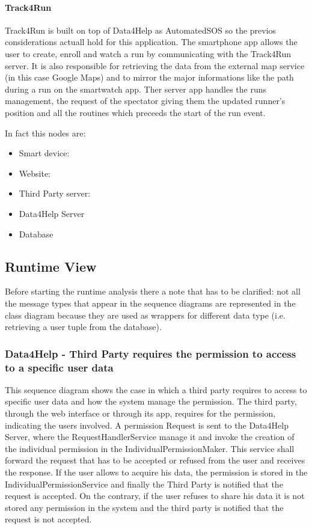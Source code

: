 \documentclass[a4paper]{article}
\begin{document}
\paragraph{Track4Run}
Track4Run is built on top of Data4Help as AutomatedSOS so the previos considerations actuall hold for this application. The smartphone app allows the user to create, enroll and watch a run by communicating with the Track4Run server. It is also responsible for retrieving the data from the external map service (in this case Google Maps) and to mirror the major informations like the path during a run on the smartwatch app. Ther server app handles the runs management, the request of the spectator giving them the updated runner's position and all the routines which preceeds the start of the run event.



In fact this nodes are:


\begin{itemize}
    \item Smart device: 
    \item Website:
    \item Third Party server:
    \item Data4Help Server
    \item Database
\end{itemize}

\clearpage

\subsection{Runtime View}
Before starting the runtime analysis there a note that has to be clarified: not all the message types that appear in the sequence diagrams are represented in the class diagram because they are used as wrappers for different data type (i.e. retrieving a user tuple from the database).

\subsubsection{Data4Help - Third Party requires the permission to access to a specific user data}
This sequence diagram shows the case in which a third party requires to access to specific user data and how the system manage the permission.
The third party, through the web interface or through its app, requires for the permission, indicating the users involved. A permission Request is sent to the Data4Help Server, where the RequestHandlerService manage it and invoke the creation of the individual permission in the IndividualPermissionMaker. This service shall forward the request that has to be accepted or refused from the user and receives the response. If the user allows to acquire his data, the permission is stored in the IndividualPermissionService and finally the Third Party is notified that the request is accepted.
On the contrary, if the user refuses to share his data it is not stored any permission in the system and the third party is notified that the request is not accepted.
\end{document}
